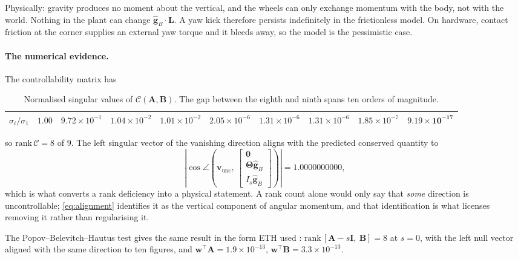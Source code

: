 Physically: gravity produces no moment about the vertical, and the wheels can
only exchange momentum with the body, not with the world. Nothing in the
plant can change $\hat{\bm{g}}_B\!\cdot\!\bm{L}$. A yaw kick therefore
persists indefinitely in the frictionless model. On hardware, contact
friction at the corner supplies an external yaw torque and it bleeds away, so
the model is the pessimistic case.

\paragraph{The numerical evidence.} The controllability matrix has

\begin{table}[htbp]
\centering
\small
\begin{tabular}{@{}lccccccccc@{}}
\toprule
$\sigma_i/\sigma_1$ & $1.00$ & $9.72\!\times\!10^{-1}$ & $1.04\!\times\!10^{-2}$
& $1.01\!\times\!10^{-2}$ & $2.05\!\times\!10^{-6}$ & $1.31\!\times\!10^{-6}$
& $1.31\!\times\!10^{-6}$ & $1.85\!\times\!10^{-7}$
& $\bm{9.19\!\times\!10^{-17}}$\\
\bottomrule
\end{tabular}
\caption{Normalised singular values of $\mathcal{C}(\bm{A},\bm{B})$. The gap
between the eighth and ninth spans ten orders of magnitude.}
\label{tab:ctrb-sv}
\end{table}

\noindent
so $\mathrm{rank}\,\mathcal{C} = 8$ of $9$. The left singular vector of the
vanishing direction aligns with the predicted conserved quantity to
%
\begin{equation}
  \left|\cos\angle\!\left(\bm{v}_{\mathrm{unc}},\,
  \begin{bmatrix}\bm{0}\\ \bm{\Theta}\hat{\bm{g}}_B\\ I_s\hat{\bm{g}}_B
  \end{bmatrix}\right)\right| = 1.0000000000 ,
  \label{eq:alignment}
\end{equation}
%
which is what converts a rank deficiency into a physical statement. A rank
count alone would only say that \emph{some} direction is uncontrollable;
\eqref{eq:alignment} identifies it as the vertical component of angular
momentum, and that identification is what licenses removing it rather than
regularising it.

The Popov--Belevitch--Hautus test gives the same result in the form ETH used
\cite{gajamohan2013cubli}: $\mathrm{rank}\,[\bm{A} - s\bm{I},\ \bm{B}] = 8$
at $s=0$, with the left null vector aligned with the same direction to ten
figures, and $\bm{w}^{\top}\bm{A} = 1.9\times10^{-13}$,
$\bm{w}^{\top}\bm{B} = 3.3\times10^{-13}$.

